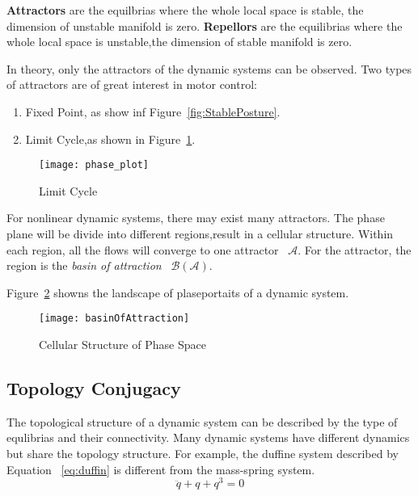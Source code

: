 \textbf{Attractors} are the equilbrias where the whole local space is stable, the dimension of unstable manifold is zero.
\textbf{Repellors} are the equilibrias where the whole local space is unstable,the dimension of stable manifold is zero.







In theory, only the attractors of the dynamic systems can be observed.
Two types of attractors are of great interest in motor control:
\begin{enumerate}
 \item Fixed Point, as show inf Figure~\ref{fig:StablePosture}.
 \item Limit Cycle,as shown in Figure~\ref{fig:ecycle}.
\end{enumerate}

\begin{figure}
	\begin{center}
	\texttt{[image: phase\_plot]}
	\caption{Limit Cycle}
	\end{center}
	\label{fig:ecycle}
\end{figure}





For nonlinear dynamic systems, there may exist many attractors.
The phase plane will be divide into different regions,result in a cellular structure.
Within each region, all the flows will converge to one attractor ~$\mathcal{A}$.
For the attractor, the region is  the \emph{basin of attraction} ~$\mathcal{B}(\mathcal{A})$.

Figure~\ref{fig:manyboa} showns the landscape of plaseportaits of a dynamic system.
\begin{figure}
\begin{center}
\texttt{[image: basinOfAttraction]}
\end{center}
\caption{Cellular Structure of Phase Space}
\label{fig:manyboa}
\end{figure}




\subsection{Topology Conjugacy}
The topological structure of a dynamic system can be described by the type of equlibrias and their connectivity.
Many dynamic systems have different dynamics but share the topology structure.
For example, the duffine system described by Equation ~\ref{eq:duffin} is different from the mass-spring system.
\begin{equation}
\label{eq:duffin}
\ddot{q}+q+q^{3}=0
\end{equation}

